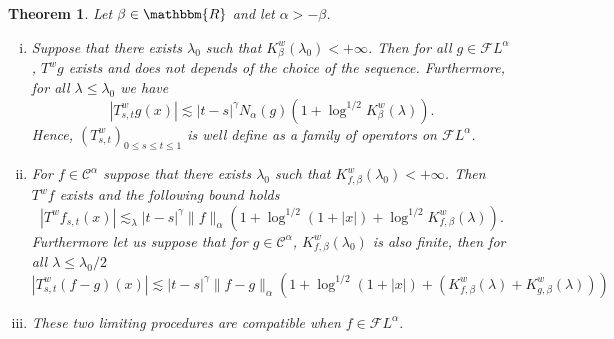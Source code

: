 \documentclass[a4paper,11pt]{article}
\newcommand{\nocomma}{}
\newenvironment{enumerateroman}{\begin{enumerate}[i.] }{\end{enumerate}}
\newtheorem{theorem}{Theorem}[section]
\newcommand{\CC}{\mathscr C}
\newcommand{\CF}{\mathscr F}
\begin{document}
\begin{theorem}
  \label{theorem:definition_T}Let $\beta \in \mathbbm{R}$ and let $\alpha >-
  \beta$.
  \begin{enumerateroman}
    \item Suppose that there exists $\lambda_{0}$ such that $K^{w}_{\beta} (
    \lambda_{0} ) <+ \infty$. Then for all $g \in \CF L^{\alpha}$, $T^{w} g$
    exists and does not depends of the choice of the sequence. Furthermore,
    for all $\lambda \leqslant \lambda_{0}$ we have
    \[ | T^{w}_{s,t} g ( x ) | \lesssim | t-s |^{\gamma} N_{\alpha} ( g ) ( 1+
       \log^{1/2} K^{w}_{\beta} ( \lambda ) ) . \]
    Hence, $( T^{w}_{s,t} )_{0 \leqslant s \leqslant t \leqslant 1}$ is well
    define as a family of operators on $\CF L^{\alpha}$.
    
    \item For $f \in \CC^{\alpha}$ suppose that there exists $\lambda_{0}$
    such that $K^{w}_{f, \beta} \nocomma ( \lambda_{0} ) <+ \infty$. Then
    $T^{w} f$ exists and the following bound holds
    \[ | T^{w} f_{s,t} ( x ) | \lesssim_{\lambda} | t-s |^{\gamma} \| f
       \|_{\alpha} ( 1+ \log^{1/2} ( 1+ | x | ) + \log^{1/2} K_{f, \beta}^{w}
       ( \lambda ) ) . \]
    Furthermore let us suppose that for $g \in \CC^{\alpha}$, $K^{w}_{f,
    \beta} ( \lambda_{0} )$ is also finite, then for all $\lambda \leqslant
    \lambda_{0} /2$
    \[ | T^{w}_{s,t} ( f-g ) ( x ) | \lesssim | t-s |^{\gamma} \| f-g
       \|_{\alpha} ( 1+ \log^{1/2} ( 1+ | x | ) + ( K^{w}_{f, \beta} ( \lambda
       ) +K^{w}_{g, \beta} ( \lambda ) ) ) \]
    \item These two limiting procedures are compatible when $f \in \CF
    L^{\alpha}$.
  \end{enumerateroman}
\end{theorem}
\end{document}
